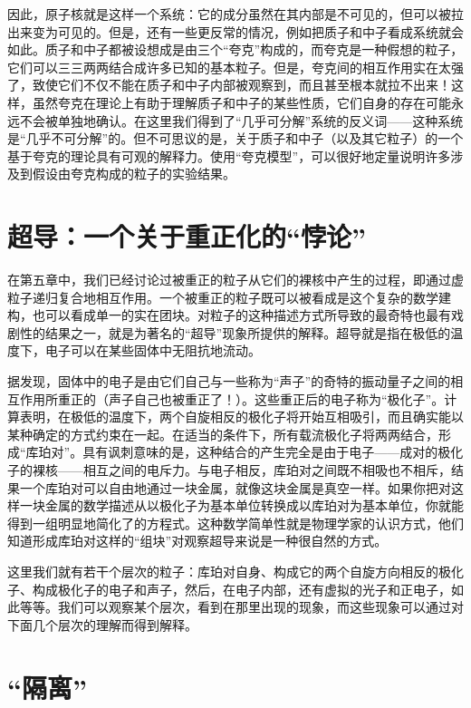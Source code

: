 因此，原子核就是这样一个系统：它的成分虽然在其内部是不可见的，但可以被拉出来变为可见的。但是，还有一些更反常的情况，例如把质子和中子看成系统就会如此。质子和中子都被设想成是由三个“夸克”构成的，而夸克是一种假想的粒子，它们可以三三两两结合成许多已知的基本粒子。但是，夸克间的相互作用实在太强了，致使它们不仅不能在质子和中子内部被观察到，而且甚至根本就拉不出来！这样，虽然夸克在理论上有助于理解质子和中子的某些性质，它们自身的存在可能永远不会被单独地确认。在这里我们得到了“几乎可分解”系统的反义词——这种系统是“几乎不可分解”的。但不可思议的是，关于质子和中子（以及其它粒子）的一个基于夸克的理论具有可观的解释力。使用“夸克模型”，可以很好地定量说明许多涉及到假设由夸克构成的粒子的实验结果。

\section{超导：一个关于重正化的“悖论”}

在第五章中，我们已经讨论过被重正的粒子从它们的裸核中产生的过程，即通过虚粒子递归复合地相互作用。一个被重正的粒子既可以被看成是这个复杂的数学建构，也可以看成单一的实在团块。对粒子的这种描述方式所导致的最奇特也最有戏剧性的结果之一，就是为著名的“超导”现象所提供的解释。超导就是指在极低的温度下，电子可以在某些固体中无阻抗地流动。

据发现，固体中的电子是由它们自己与一些称为“声子”的奇特的振动量子之间的相互作用所重正的（声子自己也被重正了！）。这些重正后的电子称为“极化子”。计算表明，在极低的温度下，两个自旋相反的极化子将开始互相吸引，而且确实能以某种确定的方式约束在一起。在适当的条件下，所有载流极化子将两两结合，形成“库珀对”。具有讽刺意味的是，这种结合的产生完全是由于电子——成对的极化子的裸核——相互之间的电斥力。与电子相反，库珀对之间既不相吸也不相斥，结果一个库珀对可以自由地通过一块金属，就像这块金属是真空一样。如果你把对这样一块金属的数学描述从以极化子为基本单位转换成以库珀对为基本单位，你就能得到一组明显地简化了的方程式。这种数学简单性就是物理学家的认识方式，他们知道形成库珀对这样的“组块”对观察超导来说是一种很自然的方式。

这里我们就有若干个层次的粒子：库珀对自身、构成它的两个自旋方向相反的极化子、构成极化子的电子和声子，然后，在电子内部，还有虚拟的光子和正电子，如此等等。我们可以观察某个层次，看到在那里出现的现象，而这些现象可以通过对下面几个层次的理解而得到解释。

\section{“隔离”}

